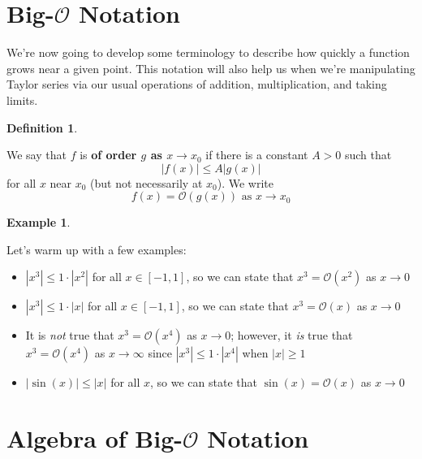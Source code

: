 \documentclass[
]{book}
\providecommand{\tightlist}{%
  \setlength{\itemsep}{0pt}\setlength{\parskip}{0pt}}
\theoremstyle{definition}
\newtheorem{definition}{Definition}[chapter]
\theoremstyle{definition}
\newtheorem{example}{Example}[chapter]
\theoremstyle{definition}
\theoremstyle{definition}
\theoremstyle{remark}
\begin{document}
\hypertarget{big-mathcalo-notation}{%
\section{\texorpdfstring{Big-\(\mathcal{O}\) Notation}{Big-\textbackslash mathcal\{O\} Notation}}\label{big-mathcalo-notation}}

We're now going to develop some terminology to describe how quickly a function grows near a given point. This notation will also help us when we're manipulating Taylor series via our usual operations of addition, multiplication, and taking limits.

\begin{definition}
\protect\hypertarget{def:unlabeled-div-254}{}\label{def:unlabeled-div-254}

We say that \(f\) is \textbf{of order \(g\) as \(x\to x_0\)} if there is a constant \(A>0\) such that \[|f(x)|\leq A|g(x)|\] for all \(x\) near \(x_0\) (but not necessarily at \(x_0\)). We write \[f(x)=\mathcal{O}(g(x))\mbox{ as } x\to x_0\]

\end{definition}

\begin{example}
\protect\hypertarget{exm:unlabeled-div-255}{}\label{exm:unlabeled-div-255}

Let's warm up with a few examples:

\begin{itemize}
\tightlist
\item
  \(|x^3|\leq 1\cdot |x^2|\) for all \(x\in [-1,1]\), so we can state that \(x^3=\mathcal{O}(x^2)\) as \(x\to 0\)
\item
  \(|x^3|\leq 1\cdot |x|\) for all \(x\in [-1,1]\), so we can state that \(x^3=\mathcal{O}(x)\) as \(x\to 0\)
\item
  It is \emph{not} true that \(x^3=\mathcal{O}(x^4)\) as \(x\to 0\); however, it \emph{is} true that \(x^3=\mathcal{O}(x^4)\) as \(x\to\infty\) since \(|x^3|\leq 1\cdot |x^4|\) when \(|x|\geq 1\)
\item
  \(|\sin(x)|\leq |x|\) for all \(x\), so we can state that \(\sin(x)=\mathcal{O}(x)\) as \(x\to 0\)
\end{itemize}

\end{example}

\hypertarget{algebra-of-big-mathcalo-notation}{%
\section{\texorpdfstring{Algebra of Big-\(\mathcal{O}\) Notation}{Algebra of Big-\textbackslash mathcal\{O\} Notation}}\label{algebra-of-big-mathcalo-notation}}
\end{document}
